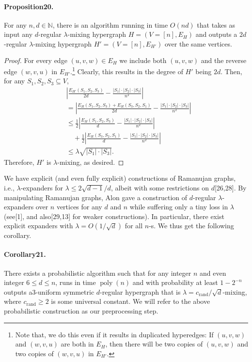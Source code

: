 \paragraph{Proposition20.} For any $n,d\in\mathbb N$, there is an algorithm running in time $O(nd)$ that takes as input any $d$-regular $\lambda$-mixing hypergraph $H=(V=[n],E_H)$ and outputs a $2d$-regular $\lambda$-mixing hypergraph $H'=(V=[n],E_{H'})$ over the same vertices.
\begin{proof}
For every edge $(u,v,w)\in E_H$ we include both $(u,v,w)$ and the reverse edge $(w,v,u)$ in $E_{H'}$.\footnote{Note that, we do this even if it results in duplicated hyperedges: If $(u,v,w)$ and $(w,v,u)$ are both in $E_H$, then there will be two copies of $(u,v,w)$ and two copies of $(w,v,u)$ in $E_{H'}$.} Clearly, this results in the degree of $H'$ being $2d$. Then, for any $S_1,S_2,S_3\subseteq V$,
\begin{align*}
&\left|\frac{E_{H'}(S_1,S_2,S_3)}{2d}-\frac{|S_1|\cdot|S_2|\cdot|S_3|}{n^2}\right|\\
&=\left|\frac{E_H(S_1,S_2,S_3)+E_H(S_3,S_2,S_1)}{2d}-\frac{|S_1|\cdot|S_2|\cdot|S_3|}{n^2}\right|\\
&\leq\frac12\left|\frac{E_H(S_1,S_2,S_3)}d-\frac{|S_1|\cdot|S_2|\cdot|S_3|}{n^2}\right|\\
&\quad+\frac12\left|\frac{E_H(S_3,S_2,S_1)}d-\frac{|S_1|\cdot|S_2|\cdot|S_3|}{n^2}\right|\\
&\leq\lambda\sqrt{|S_1|\cdot|S_3|}.
\end{align*}
Therefore, $H'$ is $\lambda$-mixing, as desired.
\end{proof}
We have explicit (and even fully explicit) constructions of Ramanujan graphs, i.e., $\lambda$-expanders for $\lambda\leq2\sqrt{d-1}/d$, albeit with some restrictions on $d$[26,28]. By manipulating Ramanujan graphs, Alon gave a construction of $d$-regular $\lambda$-expanders over $n$ vertices for any $d$ and $n$ while suffering only a tiny loss in $\lambda$ (see[1], and also[29,13] for weaker constructions). In particular, there exist explicit expanders with $\lambda=O(1/\sqrt d)$ for all $n$-s. We thus get the following corollary.
\paragraph{Corollary21.} There exists a probabilistic algorithm such that for any integer $n$ and even integer $6\leq d\leq n$, runs in time $\operatorname{poly}(n)$ and with probability at least $1-2^{-n}$ outputs a3-uniform symmetric $d$-regular hypergraph that is $\lambda=c_{\mathrm{rand}}/\sqrt d$-mixing, where $c_{\mathrm{rand}}\geq2$ is some universal constant.
We will refer to the above probabilistic construction as our preprocessing step.
